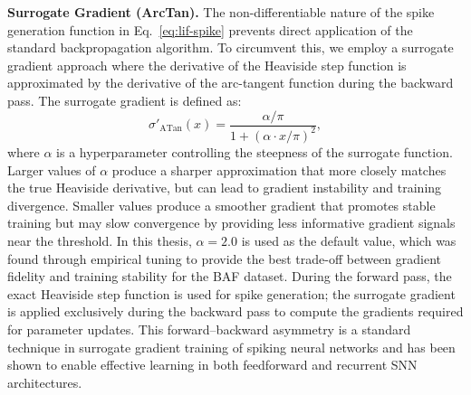 \textbf{Surrogate Gradient (ArcTan).} The non-differentiable nature of the spike generation function in Eq.~\eqref{eq:lif-spike} prevents direct application of the standard backpropagation algorithm. To circumvent this, we employ a surrogate gradient approach where the derivative of the Heaviside step function is approximated by the derivative of the arc-tangent function during the backward pass. The surrogate gradient is defined as:
\begin{equation}
\sigma'_{\text{ATan}}(x) = \frac{\alpha / \pi}{1 + \left(\alpha \cdot x / \pi\right)^2}, \label{eq:appd-surrogate-atan}
\end{equation}
where $\alpha$ is a hyperparameter controlling the steepness of the surrogate function. Larger values of $\alpha$ produce a sharper approximation that more closely matches the true Heaviside derivative, but can lead to gradient instability and training divergence. Smaller values produce a smoother gradient that promotes stable training but may slow convergence by providing less informative gradient signals near the threshold. In this thesis, $\alpha = 2.0$ is used as the default value, which was found through empirical tuning to provide the best trade-off between gradient fidelity and training stability for the BAF dataset. During the forward pass, the exact Heaviside step function is used for spike generation; the surrogate gradient is applied exclusively during the backward pass to compute the gradients required for parameter updates. This forward--backward asymmetry is a standard technique in surrogate gradient training of spiking neural networks and has been shown to enable effective learning in both feedforward and recurrent SNN architectures.
